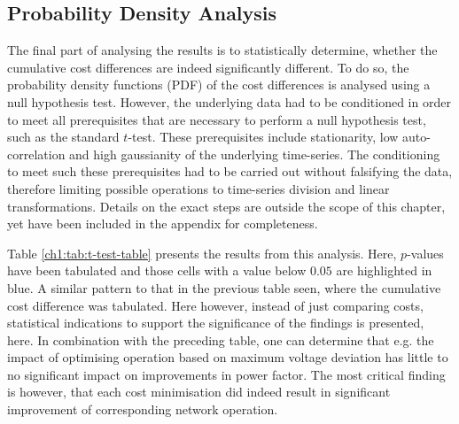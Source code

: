 \subsection{Probability Density Analysis}
\label{ch1:subsec:probability-density-analysis}

The final part of analysing the results is to statistically determine, whether the cumulative cost differences are indeed significantly different.
To do so, the probability density functions (PDF) of the  cost differences is analysed using a null hypothesis test.
However, the underlying data had to be conditioned in order to meet all prerequisites that are necessary to perform a null hypothesis test, such as the standard $t$-test.
These prerequisites include stationarity, low auto-correlation and high gaussianity of the underlying time-series.
The conditioning to meet such these prerequisites had to be carried out without falsifying the data, therefore limiting possible operations to time-series division and linear transformations.
Details on the exact steps are outside the scope of this chapter, yet have been included in the appendix for completeness.



Table \ref{ch1:tab:t-test-table} presents the results from this analysis.
Here, $p$-values have been tabulated and those cells with a value below $0.05$ are highlighted in blue.
A similar pattern to that in the previous table seen, where the cumulative cost difference was tabulated.
Here however, instead of just comparing costs, statistical indications to support the significance of the findings is presented, here.
In combination with the preceding table, one can determine that e.g. the impact of optimising operation based on maximum voltage deviation has little to no significant impact on improvements in power factor.
The most critical finding is however, that each cost minimisation did indeed result in significant improvement of corresponding network operation.
